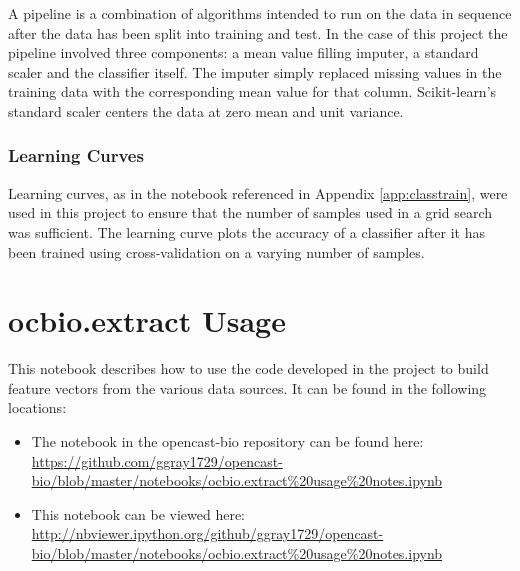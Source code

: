 A pipeline is a combination of algorithms intended to run on the data in sequence after the data has been split into training and test.
In the case of this project the pipeline involved three components: a mean value filling imputer, a standard scaler and the classifier itself.
The imputer simply replaced missing values in the training data with the corresponding mean value for that column.
Scikit-learn's standard scaler centers the data at zero mean and unit variance.


\subsubsection*{Learning Curves}
Learning curves, as in the notebook referenced in Appendix \ref{app:classtrain}, were used in this project to ensure that the number of samples used in a grid search was sufficient.
The learning curve plots the accuracy of a classifier after it has been trained using cross-validation on a varying number of samples.



\section{ocbio.extract Usage}
\label{app:ocbio}

This notebook describes how to use the code developed in the project to build feature vectors from the various data sources.
It can be found in the following locations:

\begin{itemize}
    \item The notebook in the opencast-bio repository can be found here: \url{https://github.com/ggray1729/opencast-bio/blob/master/notebooks/ocbio.extract%20usage%20notes.ipynb}
    \item This notebook can be viewed here: \url{http://nbviewer.ipython.org/github/ggray1729/opencast-bio/blob/master/notebooks/ocbio.extract%20usage%20notes.ipynb}
\end{itemize}

